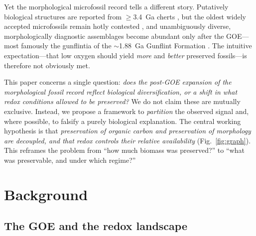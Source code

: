 \documentclass[11pt]{article}
\begin{document}
Yet the morphological microfossil record tells a different story. Putatively biological structures
are reported from $\ge$3.4~Ga cherts \citep{Schopf1993}, but the oldest widely accepted
microfossils remain hotly contested \citep{Brasier2002}, and unambiguously diverse, morphologically
diagnostic assemblages become abundant only after the GOE---most famously the gunflintia of the
$\sim$1.88~Ga Gunflint Formation \citep[reviewed in][]{Javaux2018,Wacey2014}. The intuitive
expectation---that low oxygen should yield \emph{more} and \emph{better} preserved fossils---is
therefore not obviously met.

This paper concerns a single question: \emph{does the post-GOE expansion of the morphological
fossil record reflect biological diversification, or a shift in what redox conditions allowed to
be preserved?} We do not claim these are mutually exclusive. Instead, we propose a framework to
\emph{partition} the observed signal and, where possible, to falsify a purely biological
explanation. The central working hypothesis is that \emph{preservation of organic carbon and
preservation of morphology are decoupled, and that redox controls their relative availability}
(Fig.~\ref{fig:graph}). This reframes the problem from ``how much biomass was preserved?'' to
``what was preservable, and under which regime?''

\section{Background}

\subsection{The GOE and the redox landscape}
\end{document}

